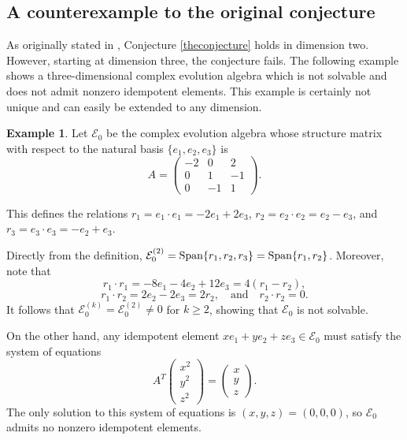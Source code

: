 \documentclass[11pt]{article}
\theoremstyle{definition}
\newtheorem{exm}[thm]{Example}
\numberwithin{equation}{section}
\begin{document}
\begin{aiblock}

\subsection*{A counterexample to the original conjecture}

As originally stated in \cite{GP26}, Conjecture \ref{theconjecture} holds in dimension two. However, starting at dimension three, the conjecture fails. The following example shows a three-dimensional complex evolution algebra which is not solvable and does not admit nonzero idempotent elements. This example is certainly not unique and can easily be extended to any dimension.


\begin{exm}Let $\mathcal E_0$ be the complex evolution algebra whose structure matrix with respect to the natural basis $\{e_1,e_2,e_3\}$ is
\[
A = \begin{pmatrix}
    - 2 & 0 & 2 \\
      0 & 1 & -1 \\
      0 & -1 & 1
\end{pmatrix}.
\]

 \noindent This defines the relations $r_1 = e_1 \cdot e_1 = -2 e_1 + 2 e_3$, $r_2 = e_2\cdot e_2 =e_2 - e_3$, and $r_3 =  e_3\cdot e_3 = -e_2 + e_3$.

 Directly from the definition,
 $\mathcal E_0^{(2)} = \operatorname{Span}\{r_1, r_2, r_3\} = \operatorname{Span}\{r_1, r_2\}$.
 Moreover, note that
 \[
 r_1 \cdot r_1 = -8e_1 -4 e_2 +12e_3 = 4  ( r_1 - r_2),
 \]
 \[
 r_1 \cdot r_2 = 2e_2 - 2 e_3 = 2r_2,
 \quad \text{and} \quad
 r_2\cdot r_2 = 0.
 \]
 It follows that $\mathcal E_0^{(k)} = \mathcal E_0^{(2)}\neq 0$ for $k\geq 2$, showing that $\mathcal E_0$ is not solvable.

 On the other hand, any idempotent element $x e_1 + y e_2 + ze_3 \in \mathcal E_0$ must satisfy the system of equations
 \[
 A^T
 \begin{pmatrix}
 x^2 \\ y^2 \\ z^2
 \end{pmatrix}
 =
 \begin{pmatrix}
         x \\ y \\ z
      \end{pmatrix}.
\]
The only solution to this system of equations is $(x,y,z) = (0,0,0)$, so $\mathcal E_0$ admits no nonzero idempotent elements.
\end{exm}

\end{aiblock}
\end{document}
